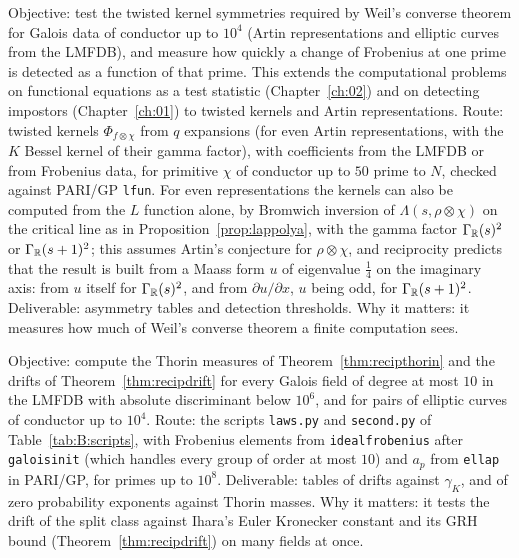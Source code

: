 \begin{compproblem}\label{cp:recipkernel}
Objective: test the twisted kernel symmetries required by Weil's converse theorem for Galois data of conductor up to $10^4$ (Artin representations and elliptic curves from the LMFDB), and measure how quickly a change of Frobenius at one prime is detected as a function of that prime. This extends the computational problems on functional equations as a test statistic (Chapter~\ref{ch:02}) and on detecting impostors (Chapter~\ref{ch:01}) to twisted kernels and Artin representations. Route: twisted kernels $\Phi_{f\otimes\chi}$ from $q$ expansions (for even Artin representations, with the $K$ Bessel kernel of their gamma factor), with coefficients from the LMFDB or from Frobenius data, for primitive $\chi$ of conductor up to $50$ prime to $N$, checked against PARI/GP \texttt{lfun}. For even representations the kernels can also be computed from the $L$ function alone, by Bromwich inversion of $\Lambda(s,\rho\otimes\chi)$ on the critical line as in Proposition~\ref{prop:lappolya}, with the gamma factor $\Gamma_{\mathbb{R}}(s)^2$ or $\Gamma_{\mathbb{R}}(s+1)^2$; this assumes Artin's conjecture for $\rho\otimes\chi$, and reciprocity predicts that the result is built from a Maass form $u$ of eigenvalue $\frac14$ on the imaginary axis: from $u$ itself for $\Gamma_{\mathbb{R}}(s)^2$, and from $\partial u/\partial x$, $u$ being odd, for $\Gamma_{\mathbb{R}}(s+1)^2$. Deliverable: asymmetry tables and detection thresholds. Why it matters: it measures how much of Weil's converse theorem a finite computation sees.
\end{compproblem}

\begin{compproblem}\label{cp:recipgammaproc}
Objective: compute the Thorin measures of Theorem~\ref{thm:recipthorin} and the drifts of Theorem~\ref{thm:recipdrift} for every Galois field of degree at most $10$ in the LMFDB with absolute discriminant below $10^6$, and for pairs of elliptic curves of conductor up to $10^4$. Route: the scripts \texttt{laws.py} and \texttt{second.py} of Table~\ref{tab:B:scripts}, with Frobenius elements from \texttt{idealfrobenius} after \texttt{galoisinit} (which handles every group of order at most $10$) and $a_p$ from \texttt{ellap} in PARI/GP, for primes up to $10^8$. Deliverable: tables of drifts against $\gamma_K$, and of zero probability exponents against Thorin masses. Why it matters: it tests the drift of the split class against Ihara's Euler Kronecker constant and its GRH bound (Theorem~\ref{thm:recipdrift}) on many fields at once.
\end{compproblem}

